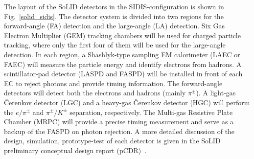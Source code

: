 The layout of the SoLID detectors in the SIDIS-configuration is shown in Fig.~\ref{solid_sidis}. The detector system is divided into two regions for the forward-angle (FA) detection and the large-angle (LA) detection. Six Gas Electron Multiplier (GEM) tracking chambers will be used for charged particle tracking, where only the first four of them will be used for the large-angle detection. In each region, a Shashlyk-type sampling EM calorimeter (LAEC or FAEC) will measure the particle energy and identify electrons from hadrons. A scintillator-pad detector (LASPD and FASPD) will be installed in front of each EC to reject photons and provide timing information. The forward-angle detectors will detect both the electrons and hadrons (mainly $\pi^{\pm}$). A light-gas \v{C}erenkov detector (LGC) and a heavy-gas \v{C}erenkov detector (HGC) will perform the $e/\pi^{\pm}$ and $\pi^{\pm}/K^{\pm}$ separation, respectively. The Multi-gas Resistive Plate Chamber (MRPC) will provide a precise timing measurement and serve as a backup of the FASPD on photon rejection. A more detailed discussion of the design, simulation, prototype-test of each detector is given in the SoLID preliminary conceptual design report (pCDR)~\cite{solid_pcdr}. 

